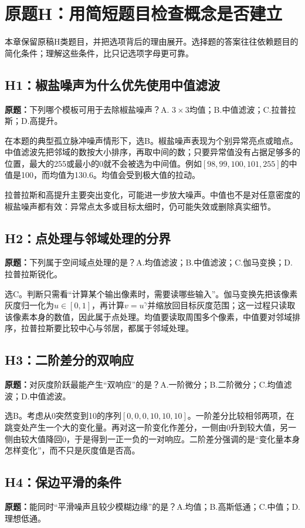 \section{原题H：用简短题目检查概念是否建立}
本章保留原稿H类题目，并把选项背后的理由展开。选择题的答案往往依赖题目的简化条件；理解这些条件，比只记选项字母更可靠。

\subsection{H1：椒盐噪声为什么优先使用中值滤波}
\label{original:H1}
\textbf{原题：}下列哪个模板可用于去除椒盐噪声？A. $3\times3$均值；B.中值滤波；C.拉普拉斯；D.高提升。

在本题的典型孤立脉冲噪声情形下，选B。椒盐噪声表现为个别异常亮点或暗点。中值滤波先把邻域的数按大小排序，再取中间的数；只要异常值没有占据足够多的位置，最大的255或最小的0就不会被选为中间值。例如$[98,99,100,101,255]$的中值是100，而均值为130.6。均值会受到极大值的拉动。

拉普拉斯和高提升主要突出变化，可能进一步放大噪声。中值也不是对任意密度的椒盐噪声都有效：异常点太多或目标太细时，仍可能失效或删除真实细节。

\subsection{H2：点处理与邻域处理的分界}
\label{original:H2}
\textbf{原题：}下列属于空间域点处理的是？A.均值滤波；B.中值滤波；C.伽马变换；D.拉普拉斯锐化。

选C。判断只需看“计算某个输出像素时，需要读哪些输入”。伽马变换先把该像素灰度归一化为$u\in[0,1]$，再计算$v=u^\gamma$并缩放回目标灰度范围；这一过程只读取该像素本身的数值，因此属于点处理。均值要读取周围多个像素，中值要对邻域排序，拉普拉斯要比较中心与邻居，都属于邻域处理。

\subsection{H3：二阶差分的双响应}
\label{original:H3}
\textbf{原题：}对灰度阶跃最能产生“双响应”的是？A.一阶微分；B.二阶微分；C.均值滤波；D.中值滤波。

选B。考虑从0突然变到10的序列$[0,0,0,10,10,10]$。一阶差分比较相邻两项，在跳变处产生一个大的变化量。再对这一阶变化作差分，一侧由0升到较大值，另一侧由较大值降回0，于是得到一正一负的一对响应。二阶差分强调的是“变化量本身怎样变化”，而不只是灰度值是否高。

\subsection{H4：保边平滑的条件}
\label{original:H4}
\textbf{原题：}能同时“平滑噪声且较少模糊边缘”的是？A.均值；B.高斯低通；C.中值；D.理想低通。

